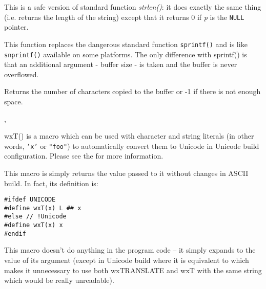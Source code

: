 \label{wxstrlen}


This is a safe version of standard function {\it strlen()}: it does exactly the
same thing (i.e. returns the length of the string) except that it returns 0 if
{\it p} is the {\tt NULL} pointer.


\label{wxsnprintf}


This function replaces the dangerous standard function {\tt sprintf()} and is
like {\tt snprintf()} available on some platforms. The only difference with
sprintf() is that an additional argument - buffer size - is taken and the
buffer is never overflowed.

Returns the number of characters copied to the buffer or -1 if there is not
enough space.


, 


\label{wxt}



wxT() is a macro which can be used with character and string literals (in other
words, {\tt 'x'} or {\tt "foo"}) to automatically convert them to Unicode in
Unicode build configuration. Please see the 
 for more information.

This macro is simply returns the value passed to it without changes in ASCII
build. In fact, its definition is:
\begin{verbatim}
#ifdef UNICODE
#define wxT(x) L ## x
#else // !Unicode
#define wxT(x) x
#endif
\end{verbatim}


\label{wxtranslate}


This macro doesn't do anything in the program code -- it simply expands to the
value of its argument (except in Unicode build where it is equivalent to 
 which makes it unnecessary to use both wxTRANSLATE and wxT
with the same string which would be really unreadable).

